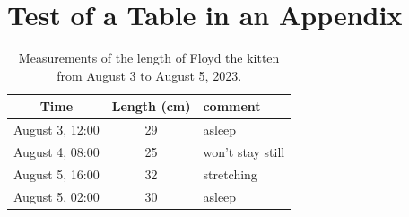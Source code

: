 \chapter{Test of a Table in an Appendix}\label{ch:testappendixtable}
\begin{table}[ht]
    \begin{centering}
    \begin{tabular}{c c l}
    
   
    \bf
    Time&\qquad \bf Length (cm)\qquad & \bf comment\\
    \hline
    \rm
    August 3, 12:00& 29&asleep\\
    August 4, 08:00& 25 &won't stay still\\
    August 5, 16:00& 32 &stretching\\
    August 5, 02:00& 30 &asleep\\
    \end{tabular}
    
    \caption[Kitten length measurements]{Measurements of the length of Floyd the kitten from August 3 to August 5, 2023.}
    \label{atab:kitten}
    \end{centering}
\end{table}